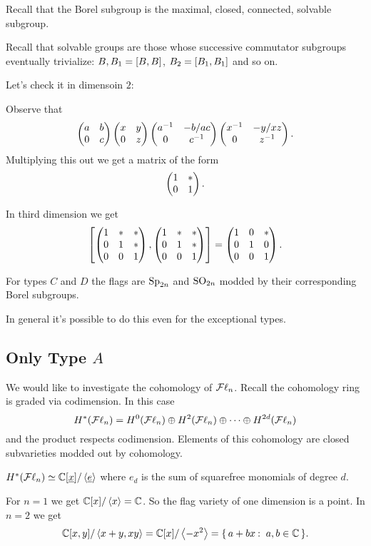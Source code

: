\documentclass[12pt]{memoir}
\begin{document}
Recall that the Borel subgroup is the maximal, closed, connected, solvable subgroup. 

\begin{Rmk}
    Recall that solvable groups are those whose successive commutator subgroups eventually trivialize: $B,B_1=\left\lbrack B,B\right\rbrack$, $B_2=\left\lbrack B_1,B_1\right\rbrack$ and so on. 
\end{Rmk}

Let's check it in dimensoin $2$:

\begin{Ex}
    Observe that 
    $$\begin{pmatrix} a & b \\ 0 & c \end{pmatrix}\begin{pmatrix} x & y \\ 0 & z \end{pmatrix}\begin{pmatrix} a^{-1} & -b/ac \\ 0 & c^{-1} \end{pmatrix}\begin{pmatrix} x^{-1} & -y/xz \\ 0 & z^{-1} \end{pmatrix}.$$
    Multiplying this out we get a matrix of the form 
    $$\begin{pmatrix} 1 & \ast \\ 0 & 1 \end{pmatrix}.$$
\end{Ex}

In third dimension we get 
$$\left\lbrack\begin{pmatrix} 1 & \ast & \ast \\ 0 & 1 & \ast \\ 0 & 0 & 1 \end{pmatrix},\begin{pmatrix} 1 & \ast & \ast \\ 0 & 1 & \ast \\ 0 & 0 & 1 \end{pmatrix}\right\rbrack=\begin{pmatrix} 1 & 0 & \ast \\ 0 & 1 & 0 \\ 0 & 0 & 1 \end{pmatrix}.$$

\begin{Ex}
    For types $C$ and $D$ the flags are $\mathrm{Sp}_{2n}$ and $\mathrm{SO}_{2n}$ modded by their corresponding Borel subgroups.
\end{Ex}

In general it's possible to do this even for the exceptional types. 

\subsection{Only Type $A$}

We would like to investigate the cohomology of $\operatorname{\mathcal{F}\ell}_n$. Recall the cohomology ring is graded via codimension. In this case 
$$H^\ast(\operatorname{\mathcal{F}\ell}_n)=H^0(\operatorname{\mathcal{F}\ell}_n)\oplus H^2(\operatorname{\mathcal{F}\ell}_n)\oplus\cdots\oplus H^{2d}(\operatorname{\mathcal{F}\ell}_n)$$
and the product respects codimension. Elements of this cohomology are closed subvarieties modded out by cohomology. 

\begin{Th}
    $H^\ast(\operatorname{\mathcal{F}\ell}_n)\simeq\mathbb{C}[\underline x]/\left\langle \underline e\right\rangle$ where $e_d$ is the sum of squarefree monomials of degree $d$.
\end{Th}

\begin{Ex}
    For $n=1$ we get $\mathbb{C}[x]/\left\langle x\right\rangle=\mathbb{C}$. So the flag variety of one dimension is a point. In $n=2$ we get
    $$\bC[x,y]/\genr{x+y,xy}=\bC[x]/\genr{-x^2}=\set{a+bx\:\ a,b\in\bC}.$$
\end{Ex}
\end{document}
